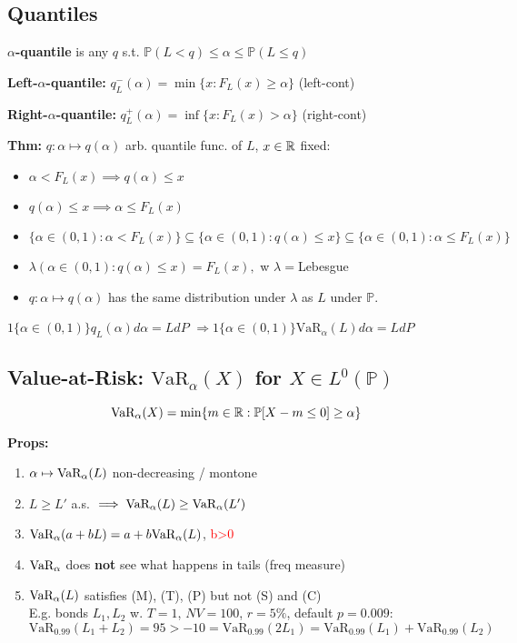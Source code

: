 \subsection*{Quantiles}
\textbf{$\alpha$-quantile} is any $q$ s.t. $\mathbb{P}(L<q)\leq \alpha \leq \mathbb{P}(L\leq q)$ 


\textbf{Left-$\alpha$-quantile:} $q^-_L(\alpha)=\min\{x:F_L(x)\geq\alpha\}$ 
(left-cont)

\textbf{Right-$\alpha$-quantile:} $q^+_L(\alpha)=\inf\{x:F_L(x)>\alpha\}$
(right-cont)

\textbf{Thm:} $q:\alpha\mapsto q(\alpha)$ arb. quantile func. of $L$, $x\in\mathbb{R}$ fixed:
\begin{itemize}
    \item $\alpha<F_L(x)\implies q(\alpha)\leq x$
    \item $q(\alpha)\leq x \implies \alpha\leq F_L(x) $
    \item $\{\alpha\in(0,1):\alpha<F_L(x)\}\subseteq \{\alpha\in (0,1): q(\alpha)\leq x\}\subseteq \{\alpha\in(0,1):\alpha\leq F_L(x)\}$
    \item $\lambda(\alpha\in (0,1): q(\alpha)\leq x)=F_L(x),$ w $\lambda=$Lebesgue
    \item $q:\alpha\mapsto q(\alpha)$ has the same distribution under $\lambda$ as $L$ under $\mathbb{P}$.
\end{itemize}

$1\{\alpha\in (0,1)\}q_L(\alpha)d\alpha = L dP$
$\Rightarrow 1\{\alpha\in (0,1)\}\text{VaR}_{\alpha}(L)d\alpha=LdP$


\subsection*{Value-at-Risk: $\text{VaR}_\alpha(X)$ for $X\in L^0(\mathbb{P})$}
\[
  \text{VaR}_\alpha(X) = \min\{m\in\mathbb{R} : \mathbb{P}[X - m \leq 0]
  \geq \alpha\}
\]

\textbf{Props:}
\begin{enumerate}
    \item $\alpha\mapsto \text{VaR}_\alpha(L)$ non-decreasing / montone
    \item $L\geq L'$ a.s. $\implies \text{VaR}_\alpha(L)\geq \text{VaR}_\alpha(L')$
    \item $\text{VaR}_\alpha(a + bL) = a + b\text{VaR}_\alpha(L)$, \quad \textcolor{red}{b>0}
    \item $\text{VaR}_\alpha$ does \textbf{not} see what happens in tails (freq measure)
    \item $\text{VaR}_\alpha(L)$ satisfies (M), (T), (P) but not (S) and (C)\\
    E.g. bonds $L_1,L_2$ w. $T=1$, $NV=100$, $r=5\%$, default $p = 0.009$: $\text{VaR}_{0.99}(L_1+L_2)=95>-10=\text{VaR}_{0.99}(2L_1)=\text{VaR}_{0.99}(L_1)+\text{VaR}_{0.99}(L_2)$
\end{enumerate}

